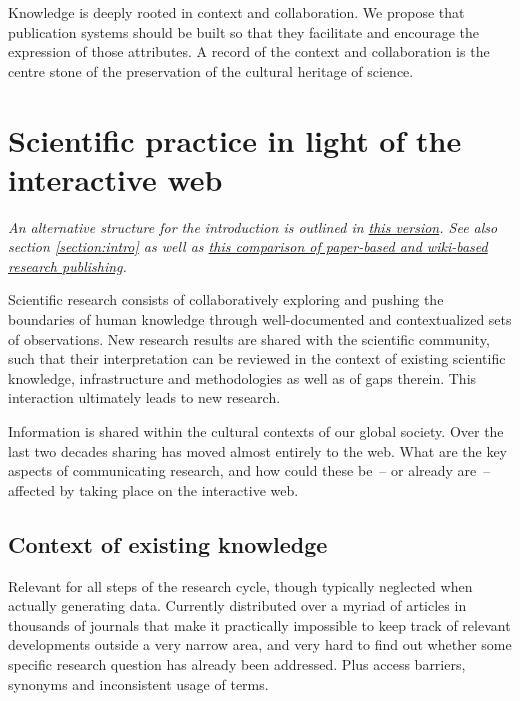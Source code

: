 \documentclass[final,authoryear,3p]{elsarticle-open-drafting}
\begin{document}
Knowledge is deeply rooted in context and collaboration. We propose that publication systems should be built so that they facilitate and encourage the expression of those attributes. A record of the context and collaboration is the centre stone of the preservation of the cultural heritage of science. 




\section{Scientific practice in light of the interactive web}
\label{section:intro2}
{\it An alternative structure for the introduction is outlined in \href{https://github.com/Daniel-Mietchen/Open-Research-Proposals/blob/1c101eb017c9bcb2a8ec72932eff36085bf64590/open-drafting.tex}{this version}. See also section \ref{section:intro} as well as \href{http://en.wikiversity.org/wiki/Wikis_in_scholarly_communication#Comparison_between_paper-based_and_wiki-based_scholarly_communication_systems}{this comparison of paper-based and wiki-based research publishing}.}

Scientific research consists of collaboratively exploring and pushing the boundaries of human knowledge through 
well-documented and contextualized sets of observations. New research results are shared with the scientific 
community, such that their interpretation can be reviewed in the context of existing scientific knowledge, infrastructure 
and methodologies as well as of gaps therein. This interaction ultimately leads to new research. 

Information is shared within the cultural contexts of our global society. Over the last two decades sharing has moved almost entirely to the web. What are the key aspects of communicating research, and how could these be~-- or already are~-- affected by taking place on the interactive web.

\subsection{Context of existing knowledge}
Relevant for all steps of the research cycle, though typically neglected when actually generating data. Currently distributed over a myriad of articles in thousands of journals that make it practically impossible to keep track of relevant developments outside a very narrow area, and very hard to find out whether some specific research question has already been addressed. Plus access barriers, synonyms and inconsistent usage of terms.
\end{document}
